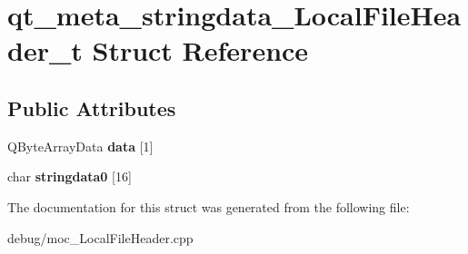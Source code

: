 \hypertarget{structqt__meta__stringdata___local_file_header__t}{}\section{qt\+\_\+meta\+\_\+stringdata\+\_\+\+Local\+File\+Header\+\_\+t Struct Reference}
\label{structqt__meta__stringdata___local_file_header__t}
\subsection*{Public Attributes}
\begin{DoxyCompactItemize}
\item 
Q\+Byte\+Array\+Data {\bfseries data} \mbox{[}1\mbox{]}\hypertarget{structqt__meta__stringdata___local_file_header__t_a7aaf08500ca7f6324081d8667b866913}{}\label{structqt__meta__stringdata___local_file_header__t_a7aaf08500ca7f6324081d8667b866913}

\item 
char {\bfseries stringdata0} \mbox{[}16\mbox{]}\hypertarget{structqt__meta__stringdata___local_file_header__t_a23eb309f06a081958a19566c317195b3}{}\label{structqt__meta__stringdata___local_file_header__t_a23eb309f06a081958a19566c317195b3}

\end{DoxyCompactItemize}


The documentation for this struct was generated from the following file\+:\begin{DoxyCompactItemize}
\item 
debug/moc\+\_\+\+Local\+File\+Header.\+cpp\end{DoxyCompactItemize}
